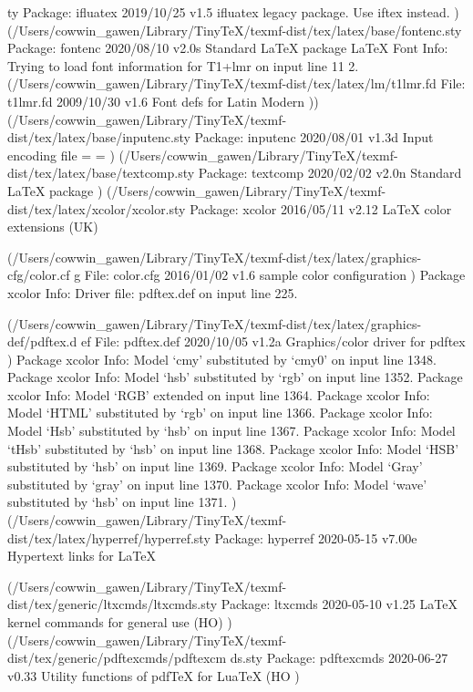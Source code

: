ty
Package: ifluatex 2019/10/25 v1.5 ifluatex legacy package. Use iftex instead.
) (/Users/cowwin_gawen/Library/TinyTeX/texmf-dist/tex/latex/base/fontenc.sty
Package: fontenc 2020/08/10 v2.0s Standard LaTeX package
LaTeX Font Info:    Trying to load font information for T1+lmr on input line 11
2.
(/Users/cowwin_gawen/Library/TinyTeX/texmf-dist/tex/latex/lm/t1lmr.fd
File: t1lmr.fd 2009/10/30 v1.6 Font defs for Latin Modern
)) (/Users/cowwin_gawen/Library/TinyTeX/texmf-dist/tex/latex/base/inputenc.sty
Package: inputenc 2020/08/01 v1.3d Input encoding file
\inpenc@prehook=
\inpenc@posthook=
) (/Users/cowwin_gawen/Library/TinyTeX/texmf-dist/tex/latex/base/textcomp.sty
Package: textcomp 2020/02/02 v2.0n Standard LaTeX package
) (/Users/cowwin_gawen/Library/TinyTeX/texmf-dist/tex/latex/xcolor/xcolor.sty
Package: xcolor 2016/05/11 v2.12 LaTeX color extensions (UK)

(/Users/cowwin_gawen/Library/TinyTeX/texmf-dist/tex/latex/graphics-cfg/color.cf
g
File: color.cfg 2016/01/02 v1.6 sample color configuration
)
Package xcolor Info: Driver file: pdftex.def on input line 225.

(/Users/cowwin_gawen/Library/TinyTeX/texmf-dist/tex/latex/graphics-def/pdftex.d
ef
File: pdftex.def 2020/10/05 v1.2a Graphics/color driver for pdftex
)
Package xcolor Info: Model `cmy' substituted by `cmy0' on input line 1348.
Package xcolor Info: Model `hsb' substituted by `rgb' on input line 1352.
Package xcolor Info: Model `RGB' extended on input line 1364.
Package xcolor Info: Model `HTML' substituted by `rgb' on input line 1366.
Package xcolor Info: Model `Hsb' substituted by `hsb' on input line 1367.
Package xcolor Info: Model `tHsb' substituted by `hsb' on input line 1368.
Package xcolor Info: Model `HSB' substituted by `hsb' on input line 1369.
Package xcolor Info: Model `Gray' substituted by `gray' on input line 1370.
Package xcolor Info: Model `wave' substituted by `hsb' on input line 1371.
)
(/Users/cowwin_gawen/Library/TinyTeX/texmf-dist/tex/latex/hyperref/hyperref.sty
Package: hyperref 2020-05-15 v7.00e Hypertext links for LaTeX

(/Users/cowwin_gawen/Library/TinyTeX/texmf-dist/tex/generic/ltxcmds/ltxcmds.sty
Package: ltxcmds 2020-05-10 v1.25 LaTeX kernel commands for general use (HO)
)
(/Users/cowwin_gawen/Library/TinyTeX/texmf-dist/tex/generic/pdftexcmds/pdftexcm
ds.sty
Package: pdftexcmds 2020-06-27 v0.33 Utility functions of pdfTeX for LuaTeX (HO
)

